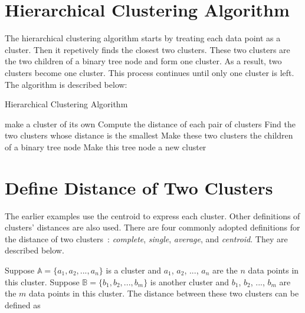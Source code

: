 \section{Hierarchical Clustering Algorithm}

The hierarchical clustering algorithm starts by treating each data
point as a cluster. Then it repetively finds the closest two clusters.
These two clusters are the two children of a binary tree node and form
one cluster.  As a result, two clusters become one cluster.  This
process continues until only one cluster is left.
The algorithm is described below:

\begin{algorithm}
    \caption[]{Hierarchical Clustering Algorithm}
    \begin{algorithmic}[1]
        make a cluster of its own
      \EndFor
      \State Compute the distance of each pair of clusters
      \State Find the two clusters whose distance is the smallest
      \State Make these two clusters the children of a binary tree node
      \State Make this tree node a new cluster 
      \EndWhile
    \end{algorithmic}
    \label{algorithm:hierarchicalclustering}
\end{algorithm}

\section{Define Distance of Two Clusters}


The earlier examples use the centroid to express each cluster.  Other
definitions of clusters' distances are also used.  There are four
commonly adopted definitions for the distance of two
clusters~\cite{James2013IntroductiontoStatistical}: {\it complete},
{\it single}, {\it average}, and {\it centroid}.  They are described
below.

Suppose $\mathds{A} = \{a_1, a_2, ..., a_n\}$ is a cluster
and $a_1$, $a_2$, ..., $a_n$ are the $n$ data points in this cluster.
Suppose $\mathds{B} = \{b_1, b_2, ..., b_m\}$ is another cluster
and $b_1$, $b_2$, ..., $b_m$ are the $m$ data points in this cluster.
The distance between these two clusters can be defined as

